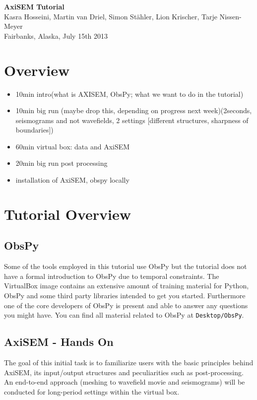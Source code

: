 \documentclass{article}
\begin{document}
\begin{center}
\title{}
\LARGE{ \textbf{\sc AxiSEM Tutorial}}
\vspace*{0.1cm}\\
{\large 
Kasra Hosseini, Martin van Driel, Simon St\"{a}hler, 
Lion Krischer, Tarje Nissen-Meyer \\
{Fairbanks, Alaska, July 15th 2013}
}
\end{center}

\section{Overview}
\baselineskip=13pt
%
\begin{itemize}
\item 10min intro(what is AXISEM, ObsPy; what we want to do in the tutorial)
\item 10min big run (maybe drop this, depending on progress next week)(2seconds, seismograms 
and not wavefields, 2 settings [different structures, sharpness of boundaries])
\item  60min virtual box: data and AxiSEM
\item  20min big run post processing
\item installation of AxiSEM, obspy locally
\end{itemize}
%
\section{Tutorial Overview}
%
\subsection{ObsPy}
Some of the tools employed in this tutorial use ObsPy but the tutorial
does not have a formal introduction to ObsPy due to temporal
constraints. The VirtualBox image contains an extensive amount of
training material for Python, ObsPy and some third party libraries
intended to get you started. Furthermore one of the core developers of
ObsPy is present and able to answer any questions you might have. You
can find all material related to ObsPy at \verb|Desktop/ObsPy|.
%
\subsection{AxiSEM - Hands On}
The goal of this initial task is to familiarize users with the basic
principles behind AxiSEM, its input/output structures and
peculiarities such as post-processing. An end-to-end approach (meshing to
wavefield movie and seismograms) will be conducted for long-period
settings within the virtual box.
%
\end{document}
